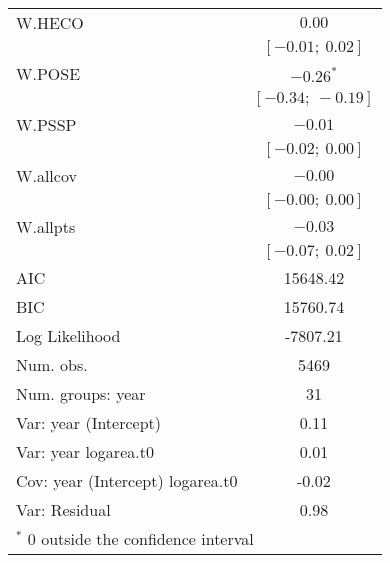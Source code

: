 \begin{table}
\begin{center}
\begin{tabular}{l c }
W.HECO                           & $0.00$            \\
                                 & $[-0.01;\ 0.02]$  \\
W.POSE                           & $-0.26^{*}$       \\
                                 & $[-0.34;\ -0.19]$ \\
W.PSSP                           & $-0.01$           \\
                                 & $[-0.02;\ 0.00]$  \\
W.allcov                         & $-0.00$           \\
                                 & $[-0.00;\ 0.00]$  \\
W.allpts                         & $-0.03$           \\
                                 & $[-0.07;\ 0.02]$  \\
\hline
AIC                              & 15648.42          \\
BIC                              & 15760.74          \\
Log Likelihood                   & -7807.21          \\
Num. obs.                        & 5469              \\
Num. groups: year                & 31                \\
Var: year (Intercept)            & 0.11              \\
Var: year logarea.t0             & 0.01              \\
Cov: year (Intercept) logarea.t0 & -0.02             \\
Var: Residual                    & 0.98              \\
\hline
\multicolumn{2}{l}{\scriptsize{$^*$ 0 outside the confidence interval}}
\end{tabular}
\label{table:POSEgrowth-byYr}
\end{center}
\end{table}



